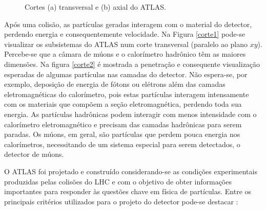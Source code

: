 \begin{figure}[tbph]
\begin{center}
\end{center} \caption{Cortes (a) transversal e (b) axial do ATLAS.}
\end{figure}

Após uma colisão, as partículas geradas interagem com o material
do detector, perdendo energia e consequentemente velocidade. Na
Figura \ref{corte1} pode-se visualizar os subsistemas do ATLAS num
corte transversal (paralelo ao plano $xy$). Percebe-se que a
câmara de múons e o calorímetro hadrônico têm as maiores
dimensões. Na figura \ref{corte2} é mostrada a penetração e
consequente visualização esperadas de algumas partículas nas
camadas do detector. Não espera-se, por exemplo, deposição de
energia de fótons ou elétrons além das camadas eletromagnéticas do
calorímetro, pois estas partículas interagem intensamente com os
materiais que compõem a seção eletromagnética, perdendo toda sua
energia. As partículas hadrônicas podem interagir com menos intensidade
com o calorímetro eletromagnético e precisam das camadas
hadrônicas para serem paradas. Os múons, em geral, são partículas que
perdem pouca energia nos calorímetros, necessitando de um sistema
especial para serem detectados, o detector de múons.


O ATLAS foi projetado e construído considerando-se as condições
experimentais produzidas pelas colisões do LHC e com o objetivo de
obter informações importantes para responder às questões chave em
física de partículas. Entre os principais critérios utilizados para
o projeto do detector pode-se destacar \cite{article:ATLAS:2008}:

